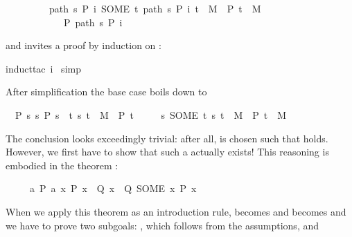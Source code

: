 \begin{isabellebody}
\begin{isamarkuptxt}
\begin{isabelle}
\ \ \ \ \ \ \ \ {\isasymLongrightarrow}\ {\isacharparenleft}path\ s\ P\ i{\isacharcomma}\ SOME\ t{\isachardot}\ {\isacharparenleft}path\ s\ P\ i{\isacharcomma}\ t{\isacharparenright}\ {\isasymin}\ M\ {\isasymand}\ P\ t{\isacharparenright}\ {\isasymin}\ M\ {\isasymand}\isanewline
\ \ \ \ \ \ \ \ \ \ \ \ P\ {\isacharparenleft}path\ s\ P\ i{\isacharparenright}
\end{isabelle}
and invites a proof by induction on :%
\end{isamarkuptxt}%
induct{\isacharunderscore}tac\ i{\isacharparenright}\isanewline
\ simp{\isacharparenright}%
\begin{isamarkuptxt}%
\noindent
After simplification the base case boils down to
\begin{isabelle}
\ \ {\isasymlbrakk}P\ s{\isacharsemicolon}\ {\isasymforall}s{\isachardot}\ P\ s\ {\isasymlongrightarrow}\ {\isacharparenleft}{\isasymexists}t{\isachardot}\ {\isacharparenleft}s{\isacharcomma}\ t{\isacharparenright}\ {\isasymin}\ M\ {\isasymand}\ P\ t{\isacharparenright}{\isasymrbrakk}\isanewline
\ \ \ \ {\isasymLongrightarrow}\ {\isacharparenleft}s{\isacharcomma}\ SOME\ t{\isachardot}\ {\isacharparenleft}s{\isacharcomma}\ t{\isacharparenright}\ {\isasymin}\ M\ {\isasymand}\ P\ t{\isacharparenright}\ {\isasymin}\ M
\end{isabelle}
The conclusion looks exceedingly trivial: after all,  is chosen such that 
holds. However, we first have to show that such a  actually exists! This reasoning
is embodied in the theorem :
\begin{isabelle}%
\ \ \ \ \ {\isasymlbrakk}{\isasymexists}a{\isachardot}\ {\isacharquery}P\ a{\isacharsemicolon}\ {\isasymAnd}x{\isachardot}\ {\isacharquery}P\ x\ {\isasymLongrightarrow}\ {\isacharquery}Q\ x{\isasymrbrakk}\ {\isasymLongrightarrow}\ {\isacharquery}Q\ {\isacharparenleft}SOME\ x{\isachardot}\ {\isacharquery}P\ x{\isacharparenright}%
\end{isabelle}
When we apply this theorem as an introduction rule,  becomes
 and  becomes  and we have to prove
two subgoals: , which follows from the assumptions, and

\end{isamarkuptxt}
\end{isabellebody}
